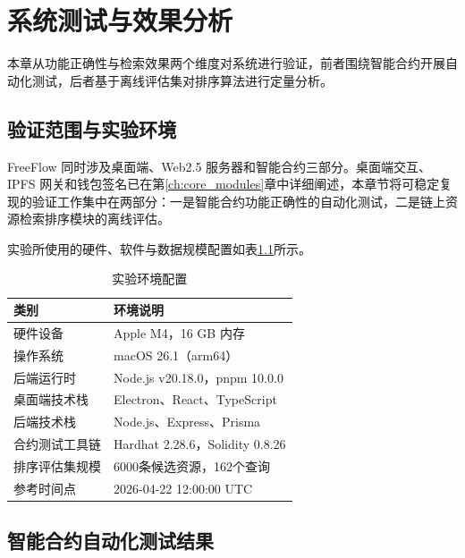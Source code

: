 
\chapter{系统测试与效果分析}\label{ch:system_testing}

本章从功能正确性与检索效果两个维度对系统进行验证，前者围绕智能合约开展自动化测试，后者基于离线评估集对排序算法进行定量分析。

\section{验证范围与实验环境}

FreeFlow 同时涉及桌面端、Web2.5 服务器和智能合约三部分。桌面端交互、IPFS 网关和钱包签名已在第\ref{ch:core_modules}章中详细阐述，本章节将可稳定复现的验证工作集中在两部分：一是智能合约功能正确性的自动化测试，二是链上资源检索排序模块的离线评估。

实验所使用的硬件、软件与数据规模配置如表\ref{tab:test_environment}所示。

\begin{table}[htbp]
    \linespread{1.5}
    \songti
    \centering
    \caption{实验环境配置}\label{tab:test_environment}
    \begin{tabular}{|l|p{10cm}|}
        \hline
        类别      & 环境说明                           \\ \hline
        硬件设备    & Apple M4，16 GB 内存              \\ \hline
        操作系统    & macOS 26.1（arm64）              \\ \hline
        后端运行时   & Node.js v20.18.0，pnpm 10.0.0   \\ \hline
        桌面端技术栈  & Electron、React、TypeScript      \\ \hline
        后端技术栈   & Node.js、Express、Prisma         \\ \hline
        合约测试工具链 & Hardhat 2.28.6，Solidity 0.8.26 \\ \hline
        排序评估集规模 & 6000条候选资源，162个查询               \\ \hline
        参考时间点   & 2026-04-22 12:00:00 UTC        \\ \hline
    \end{tabular}
\end{table}


\section{智能合约自动化测试结果}

